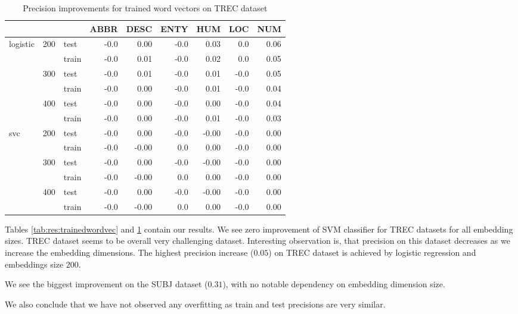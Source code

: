 \begin{table}[H]
\begin{center}

\begin{tabular}{lllrrrrrr}
\toprule
 & &&ABBR &DESC &ENTY &HUM &LOC &NUM \\
\midrule
logistic & 200 & test &-0.0 &0.00 &-0.0 & 0.03 &0.0 & 0.06 \\
 & & train &-0.0 &0.01 &-0.0 & 0.02 &0.0 & 0.05 \\
 & 300 & test &-0.0 &0.01 &-0.0 & 0.01 & -0.0 & 0.05 \\
 & & train &-0.0 &0.00 &-0.0 & 0.01 & -0.0 & 0.04 \\
 & 400 & test &-0.0 &0.00 &-0.0 & 0.00 & -0.0 & 0.04 \\
 & & train &-0.0 &0.00 &-0.0 & 0.01 & -0.0 & 0.03 \\
svc & 200 & test &-0.0 &0.00 &-0.0 &-0.00 & -0.0 & 0.00 \\
 & & train &-0.0 & -0.00 & 0.0 & 0.00 & -0.0 & 0.00 \\
 & 300 & test &-0.0 &0.00 &-0.0 &-0.00 & -0.0 & 0.00 \\
 & & train &-0.0 & -0.00 & 0.0 & 0.00 & -0.0 & 0.00 \\
 & 400 & test &-0.0 &0.00 &-0.0 &-0.00 & -0.0 & 0.00 \\
 & & train &-0.0 & -0.00 & 0.0 & 0.00 & -0.0 & 0.00 \\
\bottomrule
\end{tabular}

\caption[Precision improvements for trained word vectors on TREC dataset]{Precision improvements for trained word vectors on TREC dataset}
\label{tab:res:trainedwordvec:trec}
\end{center}
\end{table}


    Tables \ref{tab:res:trainedwordvec} and \ref{tab:res:trainedwordvec:trec} contain our results.
    We see zero improvement of SVM classifier for TREC datasets for all embedding sizes.
    TREC dataset seems to be overall very challenging dataset.
    Interesting observation is, that precision on this dataset decreases as we increase the embedding dimensions.
    The highest precision increase ($0.05$) on TREC dataset is achieved by logistic regression and embeddings size $200$. 
    
    We see the biggest improvement on the SUBJ dataset ($0.31$), with no notable dependency on embedding dimension size.  
    
    We also conclude that we have not observed any overfitting as train and test precisions are very similar.
    

